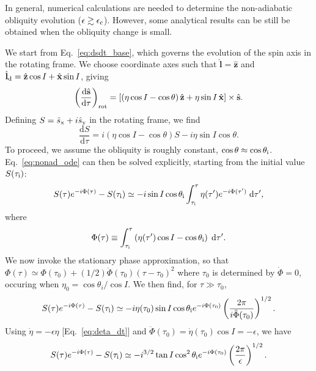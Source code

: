 \documentclass[
        fleqn,
        usenatbib,
    ]{mnras}
\newcommand*{\rd}[2]{\frac{\mathrm{d}#1}{\mathrm{d}#2}}
\newcommand*{\bm}[1]{\boldsymbol{\mathbf{#1}}}
\newcommand*{\uv}[1]{\hat{\bm{#1}}}
\newcommand*{\p}[1]{\left(#1\right)}
\newcommand*{\s}[1]{\left[#1\right]}
\begin{document}
In general, numerical calculations are needed to determine the non-adiabatic
obliquity evolution ($\epsilon\gtrsim \epsilon_{\rm c}$). However, some
analytical results can be still be obtained when the obliquity change is small.

We start from Eq.~\eqref{eq:dsdt_base}, which governs the evolution of the spin
axis in the rotating frame. We choose coordinate axes such that $\uv{l} =
\uv{z}$ and $ \uv{l}_{\rm d} = \uv{z} \cos I + \uv{x}\sin I$, giving
\begin{equation}
    \p{\rd{\uv{s}}{\tau}}_{\rm rot} = \s{
        \p{\eta \cos I - \cos \theta}\uv{z}
            + \eta \sin I \,\uv{x}} \times \uv{s}.
\end{equation}
Defining $S = {\hat s}_{\rm x} + i{\hat s}_{\rm y}$ in the rotating frame, we
find
\begin{equation}
    \rd{S}{\tau} = i\p{\eta\cos I - \cos \theta}S
        - i \eta \sin I\cos\theta.\label{eq:nonad_ode}
\end{equation}
To proceed, we assume the obliquity is roughly constant, $\cos \theta \approx
\cos \theta_{\rm i}$. Eq.~\eqref{eq:nonad_ode} can then be solved explicitly,
starting from the initial value $S(\tau_{\rm i})$:
\begin{equation}
    S(\tau)e^{-i\Phi(\tau)} - S(\tau_{\rm i})
        \simeq -i\sin I \cos \theta_{\rm i}
            \int_{\tau_{\rm i}}^\tau \eta(\tau')
            e^{-i\Phi(\tau')}\;\mathrm{d}\tau',
\end{equation}
where
\begin{equation}
    \Phi(\tau) \equiv \int_{\tau_{\rm i}}^\tau \p{\eta(\tau') \cos I
        - \cos \theta_{\rm i}}\; \mathrm{d}\tau'.
\end{equation}
We now invoke the stationary phase approximation, so that $\Phi(\tau)\simeq
\Phi(\tau_0) + (1/2)\ddot\Phi (\tau_0)(\tau - \tau_0)^2$ where $\tau_0$ is
determined by $\dot\Phi = 0$, occuring when $\eta_0 = \cos \theta_i /\cos I$. We
then find, for $\tau \gg \tau_0$,
\begin{equation}
    S(\tau)e^{-i\Phi(\tau)} - S(\tau_{\rm i})
        \simeq -i \eta(\tau_0)\sin I \cos \theta_{\rm i} e^{-i\Phi(\tau_0)}
            \p{\frac{2\pi}{i \ddot\Phi(\tau_0)}}^{1/2}.
\end{equation}
Using $\dot\eta = -\epsilon \eta$ [Eq.~\eqref{eq:deta_dt}] and
$\ddot\Phi(\tau_0) = \dot\eta(\tau_0)\cos I = -\epsilon$, we have
\begin{equation}
    S(\tau)e^{-i\Phi(\tau)} - S(\tau_{\rm i})
        \simeq -i^{3/2}\tan I \cos^2\theta_{\rm i} e^{-i\Phi(\tau_0)}
            \p{\frac{2\pi}{\epsilon}}^{1/2}.
\end{equation}
\end{document}
